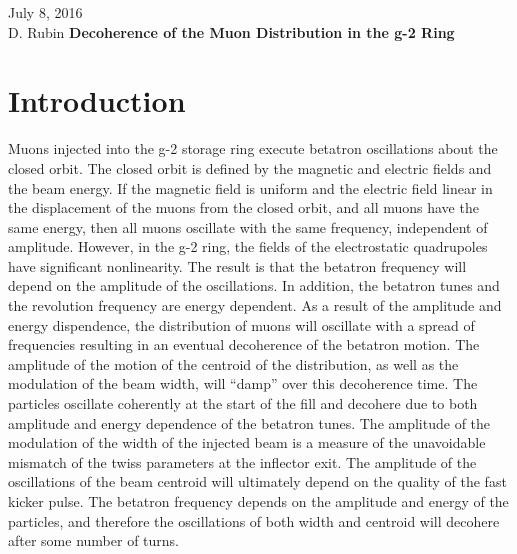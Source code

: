 \documentclass[10pt]{report}
\begin{document}
\begin{flushleft}
July 8, 2016\\
D. Rubin
\vskip 0.1in
{\bf \Large Decoherence of the Muon Distribution in the g-2 Ring}\\
\end{flushleft}

\section*{Introduction}
Muons injected into the g-2 storage ring execute betatron oscillations about the closed orbit. The closed orbit is defined by the magnetic and
electric fields and the beam energy. If the magnetic field is uniform and the electric field linear in the displacement of the muons from the closed 
orbit, and all muons have the same energy, 
then all muons oscillate with the same frequency, independent of amplitude. However, in the g-2 ring, the fields of the electrostatic quadrupoles
have significant nonlinearity. The result is that the betatron frequency will depend on the amplitude of the oscillations. In addition,
the betatron tunes and the revolution frequency are energy dependent. As a result of the amplitude and energy dispendence, the distribution of muons
will oscillate with a spread of frequencies resulting in an eventual decoherence of the betatron motion. The amplitude of the motion of the 
centroid of the distribution, as well as the modulation of the beam width,  will ``damp'' over this decoherence time.
%
%
The particles oscillate coherently at the start of the fill and decohere due to both amplitude and energy dependence of the betatron tunes. 
The amplitude of the modulation of the
width of the injected beam is a measure of the unavoidable mismatch of the twiss parameters at the inflector exit. The amplitude of the oscillations of the beam centroid
will ultimately depend on the quality of the fast kicker pulse. The betatron frequency depends on the amplitude and energy of the particles, and therefore
the oscillations of both width and centroid will decohere after some number of turns.
\end{document}

